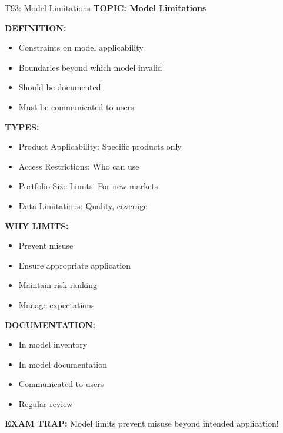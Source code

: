 \documentclass[8pt]{beamer}
\begin{document}
	\begin{frame}{T93: Model Limitations}
		\fontsize{6.5}{7.5}\selectfont
		\textbf{TOPIC: Model Limitations}
		
		\vspace{0.1cm}
		\textbf{DEFINITION:}
		\begin{itemize}
			\item Constraints on model applicability
			\item Boundaries beyond which model invalid
			\item Should be documented
			\item Must be communicated to users
		\end{itemize}
		
		\vspace{0.1cm}
		\textbf{TYPES:}
		\begin{itemize}
			\item \textcolor{myblue}{Product Applicability:} Specific products only
			\item \textcolor{myblue}{Access Restrictions:} Who can use
			\item \textcolor{myblue}{Portfolio Size Limits:} For new markets
			\item \textcolor{myblue}{Data Limitations:} Quality, coverage
		\end{itemize}
		
		\vspace{0.1cm}
		\textbf{WHY LIMITS:}
		\begin{itemize}
			\item Prevent misuse
			\item Ensure appropriate application
			\item Maintain risk ranking
			\item Manage expectations
		\end{itemize}
		
		\vspace{0.1cm}
		\textbf{DOCUMENTATION:}
		\begin{itemize}
			\item In model inventory
			\item In model documentation
			\item Communicated to users
			\item Regular review
		\end{itemize}
		
		\textcolor{myred}{\textbf{EXAM TRAP:}} Model limits prevent \textcolor{myblue}{misuse beyond intended application}!
	\end{frame}
	
\end{document}
